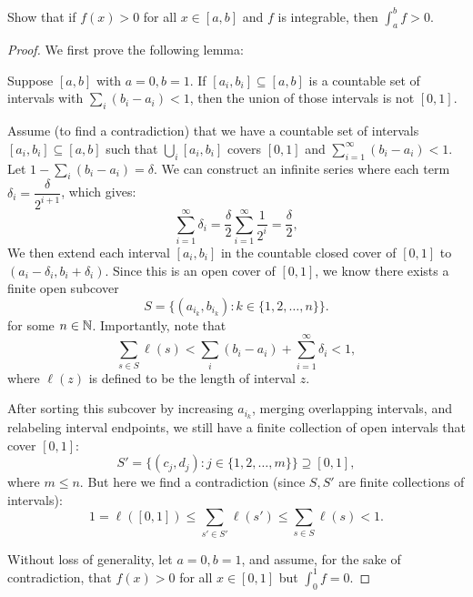 \begin{problem}
  Show that if $f(x) > 0$ for all $x \in [a, b]$ and $f$ is integrable, then $\int_{a}^{b} f > 0$.

  \begin{proof}

    We first prove the following lemma:

    \begin{lemma}
      \label{lem:union-countable-set-intervals-geq-1}
      Suppose $[a, b]$ with $a = 0, b = 1$.
      If $[a_i, b_i] \subseteq [a, b]$ is a countable set of intervals with $\sum_{i}{(b_i - a_i)} < 1$, 
      then the union of those intervals is not $[0, 1]$.
    \end{lemma}

    \begin{subproof}
      Assume (to find a contradiction) that we have a countable set of intervals $[a_i, b_i] \subseteq [a, b]$
      such that $\bigcup_{i} [a_i, b_i]$ covers $[0, 1]$ and $\sum_{i=1}^{\infty} (b_i - a_i) < 1$.
      Let $1 - \sum_{i} (b_i - a_i) = \delta$. We can construct an infinite series where each term 
      $\delta_{i} = \dfrac{\delta}{2^{i+1}}$, which gives:
      \[
        \sum_{i=1}^{\infty} \delta_{i} = \frac{\delta}{2} \sum_{i=1}^{\infty} \frac{1}{2^{i}} = \frac{\delta}{2},
      \]
      We then extend each interval $[a_{i}, b_{i}]$ in the countable closed cover of $[0, 1]$ to 
      $(a_{i} - \delta_{i}, b_{i} + \delta_{i})$. Since this is an open cover of $[0, 1]$, we know there exists
      a finite open subcover
      \[
        S = \{ (a_{i_{k}}, b_{i_{k}}) : k \in \{ 1, 2, \ldots, n \} \}.
      \]
      for some $n \in \mathbb{N}$. Importantly, note that
      \[
        \sum_{s \in S} \ell(s) < \sum_{i} (b_{i} - a_{i}) + \sum_{i=1}^{\infty} \delta_{i} < 1,
      \]
      where $\ell(z)$ is defined to be the length of interval $z$.

      After sorting this subcover by increasing $a_{i_{k}}$, merging overlapping intervals, and relabeling interval endpoints, 
      we still have a finite collection of open intervals that cover $[0, 1]$:
      \[
        S' = \{ ( c_{j}, d_{j} ) : j \in \{ 1, 2, \ldots, m \} \} \supseteq [0, 1],
      \]
      where $m \leq n$. But here we find a contradiction (since $S, S'$ are finite collections of intervals):
      \[
        1 = \ell([0, 1]) \leq \sum_{s' \in S'} \ell(s') \leq \sum_{s \in S} \ell(s) < 1.
      \]
    \end{subproof}

    Without loss of generality, let $a = 0, b = 1$, and assume, for the sake of contradiction, that 
    $f(x) > 0$ for all $x \in [0,1]$ but $\int_{0}^{1} f = 0$.
    

\end{proof}
\end{problem}
